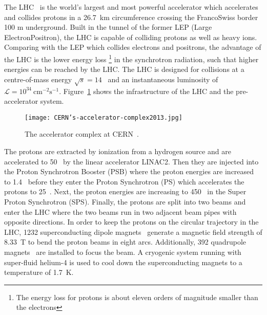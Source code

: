 The LHC~\cite{1748-0221-3-08-S08001} is the world's largest and most powerful accelerator which accelerates and collides protons in a 26.7~km circumference crossing the Franco\textendash Swiss border 100 m underground.
Built in the tunnel of the former LEP (Large Electron\textendash Positron), the LHC is capable of colliding protons as well as heavy ions.
Comparing with the LEP which collides electrons and positrons, the advantage of the LHC is the lower energy loss \footnote{The energy loss for protons is about eleven orders of magnitude smaller than the electrons} in the synchrotron radiation, such that higher energies can be reached by the LHC.
The LHC is designed for collisions at a centre-of-mass energy $\sqrt{s}=14$~{\TeV} and an instantaneous luminosity of $\mathcal{L} =10^{34}~\textrm{cm}^{-2}\textrm{s}^{-1}$.
Figure~\ref{fig:CERN_accelerator_complex} shows the infrastructure of the LHC and the pre-accelerator system.

\begin{figure}[htbp]
\begin{center}
\texttt{[image: CERN's-accelerator-complex2013.jpg]}
\caption{The accelerator complex at CERN~\cite{Marcastel:1621583}.}
\label{fig:CERN_accelerator_complex}
\end{center}
\end{figure}

The protons are extracted by ionization from a hydrogen source and are accelerated to 50~{\MeV} by the linear accelerator LINAC2.
Then they are injected into the Proton Synchrotron Booster (PSB) where the proton energies are increased to 1.4~{\GeV} before they enter the Proton Synchrotron (PS) which accelerates the protons to 25~{\GeV}.
Next, the proton energies are increasing to 450~{\GeV} in the Super Proton Synchrotron (SPS). 
Finally, the protons are split into two beams and enter the LHC where the two beams run in two adjacent beam pipes with opposite directions.
In order to keep the protons on the circular trajectory in the LHC, 1232 superconducting dipole magnets~\cite{1288863} generate a magnetic field strength of 8.33~T to bend the proton beams in eight arcs.
Additionally, 392 quadrupole magnets~\cite{1288863} are installed to focus the beam.
A cryogenic system running with super-fluid helium-4 is used to cool down the superconducting magnets to a temperature of 1.7~K.


